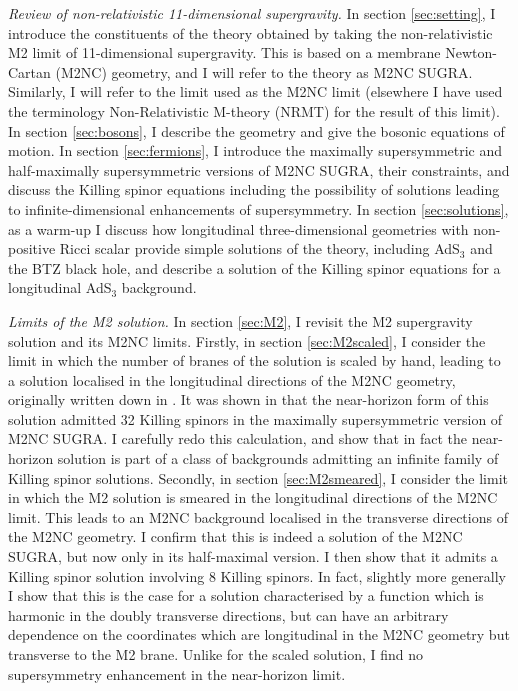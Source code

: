 \documentclass[11pt]{article}
\numberwithin{equation}{section}
\begin{document}
\vspace{0.5em}\noindent 
{\emph{Review of non-relativistic 11-dimensional supergravity.}
In section \ref{sec:setting}, I introduce the constituents of the theory obtained by taking the non-relativistic M2 limit of 11-dimensional supergravity.
This is based on a membrane Newton-Cartan (M2NC) geometry, 
and I will refer to the theory as M2NC SUGRA.
Similarly, I will refer to the limit used as the M2NC limit (elsewhere \cite{Blair:2023noj, Blair:2024aqz} I have used the terminology Non-Relativistic M-theory (NRMT) for the result of this limit).
In section \ref{sec:bosons}, I describe the geometry and give the bosonic equations of motion.
In section \ref{sec:fermions}, I introduce the maximally supersymmetric and half-maximally supersymmetric versions of M2NC SUGRA, their constraints, and discuss the Killing spinor equations including the possibility of solutions leading to infinite-dimensional enhancements of supersymmetry.
In section \ref{sec:solutions}, as a warm-up I discuss how longitudinal three-dimensional geometries with non-positive Ricci scalar provide simple solutions of the theory, including AdS${}_3$ and the BTZ black hole, and describe a solution of the Killing spinor equations for a longitudinal AdS${}_3$ background.

\vspace{0.5em}\noindent 
{\emph{Limits of the M2 solution.}
In section \ref{sec:M2}, I revisit the M2 supergravity solution and its M2NC limits.
Firstly, in section \ref{sec:M2scaled}, I consider the limit in which the number of branes of the solution is scaled by hand, leading to a solution localised in the longitudinal directions of the M2NC geometry, originally written down in \cite{Lambert:2024uue}.
It was shown in \cite{Bergshoeff:2024nin} that the near-horizon form of this solution admitted 32 Killing spinors in the maximally supersymmetric version of M2NC SUGRA.
I carefully redo this calculation, and show that in fact the near-horizon solution is part of a class of backgrounds admitting an infinite family of Killing spinor solutions.
Secondly, in section \ref{sec:M2smeared}, I consider the limit in which the M2 solution is smeared in the longitudinal directions of the M2NC limit.
This leads to an M2NC background localised in the transverse directions of the M2NC geometry.
I confirm that this is indeed a solution of the M2NC SUGRA, but now only in its half-maximal version.
I then show that it admits a Killing spinor solution involving 8 Killing spinors.
In fact, slightly more generally I show that this is the case for a solution characterised by a function which is harmonic in the doubly transverse directions, but can have an arbitrary dependence on the coordinates which are longitudinal in the M2NC geometry but transverse to the M2 brane.
Unlike for the scaled solution, I find no supersymmetry enhancement in the near-horizon limit.

}}
\end{document}
